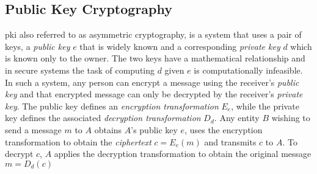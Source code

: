 \subsection{Public Key Cryptography}
\acrfull{pki} also referred to as asymmetric cryptography, is a system that uses a pair of keys, a \textit{public key} $e$ that is widely known and a corresponding \textit{private key} $d$ which is known only to the owner. The two keys have a mathematical relationship and in secure systems the task of computing $d$ given $e$ is computationally infeasible. In such a system, any person can encrypt a message using the receiver's \textit{public key} and that encrypted message can only be decrypted by the receiver's \textit{private key}. The public key defines an \textit{encryption transformation} $E_e$, while the private key defines the associated \textit{decryption transformation} $D_d$. Any entity $B$ wishing to send a message $m$ to $A$ obtains $A$'s public key $e$, uses the encryption transformation to obtain the \textit{ciphertext} $c=E_e(m)$ and transmits $c$ to $A$. To decrypt $c$, $A$ applies the decryption transformation to obtain the original message $m=D_d(c)$

